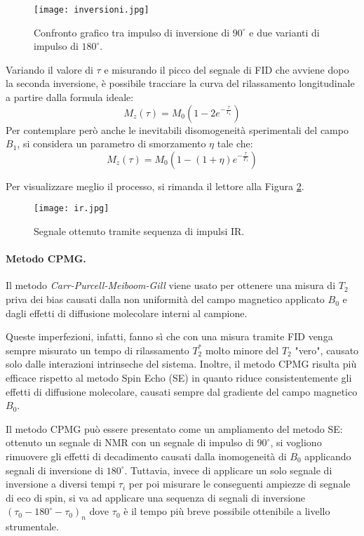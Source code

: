 \begin{figure}[ht]
\centering
\texttt{[image: inversioni.jpg]}
\caption{Confronto grafico tra impulso di inversione di $90^{\circ}$ e due varianti di impulso di $180^{\circ}$.}
\label{fig:inversioni}
\end{figure}  
\newpage
Variando il valore di $\tau$ e misurando il picco del segnale di FID che avviene dopo la seconda inversione, è possibile tracciare la curva del rilassamento longitudinale a partire dalla formula ideale:
\begin{equation}
	M_z(\tau)=M_0\left(1 - 2e^{-\frac{\tau}{T_1}}\right)
\end{equation}
Per contemplare però anche le inevitabili disomogeneità sperimentali del campo $B_1$, si considera un parametro di smorzamento $\eta$ tale che:
\begin{equation}
	M_z(\tau)=M_0\left(1 - (1+\eta)e^{-\frac{\tau}{T_1}}\right)
\end{equation}

Per visualizzare meglio il processo, si rimanda il lettore alla Figura \ref{fig:ir}.

\begin{figure}[h!]
\centering
\texttt{[image: ir.jpg]}
\caption{Segnale ottenuto tramite sequenza di impulsi IR.}
\label{fig:ir}
\end{figure}

\paragraph{Metodo CPMG.}

Il metodo \textit{Carr-Purcell-Meiboom-Gill} viene usato per ottenere una misura di $T_2$ priva dei bias causati dalla non uniformità del campo magnetico applicato $B_0$ e dagli effetti di diffusione molecolare interni al campione.

Queste imperfezioni, infatti, fanno sì che con una misura tramite FID venga sempre misurato un tempo di rilassamento $T_2^*$ molto minore del $T_2$ "vero", causato solo dalle interazioni intrinseche del sistema. Inoltre, il metodo CPMG risulta più efficace rispetto al metodo Spin Echo (SE) in quanto riduce consistentemente gli effetti di diffusione molecolare, causati sempre dal gradiente del campo magnetico $B_0$.

Il metodo CPMG può essere presentato come un ampliamento del metodo SE: ottenuto un segnale di NMR con un segnale di impulso di $90^\circ$, si vogliono rimuovere gli effetti di decadimento causati dalla inomogeneità di $B_0$ applicando segnali di inversione di $180^\circ$. Tuttavia, invece di applicare un solo segnale di inversione a diversi tempi $\tau_i$ per poi misurare le conseguenti ampiezze di segnale di eco di spin, si va ad applicare una sequenza di segnali di inversione $(\tau_0 - 180^\circ - \tau_0)_n$ dove $\tau_0$ è il tempo più breve possibile ottenibile a livello strumentale.\\

